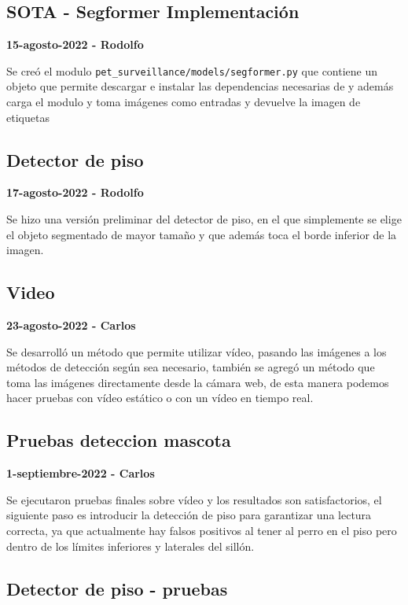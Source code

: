 \subsection*{SOTA - Segformer Implementación}

\textbf{15-agosto-2022 - Rodolfo}

Se creó el modulo \texttt{pet\_surveillance/models/segformer.py} que contiene un objeto que permite descargar e instalar las dependencias necesarias de \textcite{aung2022} y además carga el modulo y toma imágenes como entradas y devuelve la imagen de etiquetas


\subsection*{Detector de piso}

\textbf{17-agosto-2022 - Rodolfo}

Se hizo una versión preliminar del detector de piso, en el que simplemente se elige el objeto segmentado de mayor tamaño y que además toca el borde inferior de la imagen.

\subsection*{Video}

\textbf{23-agosto-2022 - Carlos}

Se desarrolló un método que permite utilizar vídeo, pasando las imágenes a los métodos de detección según sea necesario, también se agregó un método que toma las imágenes
directamente desde la cámara web, de esta manera podemos hacer pruebas con vídeo estático o con un vídeo en tiempo real.

\subsection*{Pruebas deteccion mascota}

\textbf{1-septiembre-2022 - Carlos}

Se ejecutaron pruebas finales sobre vídeo y los resultados son satisfactorios, el siguiente paso es introducir la detección de piso para garantizar una lectura correcta, ya que
actualmente hay falsos positivos al tener al perro en el piso pero dentro de los límites inferiores y laterales del sillón.

\subsection*{Detector de piso - pruebas}

